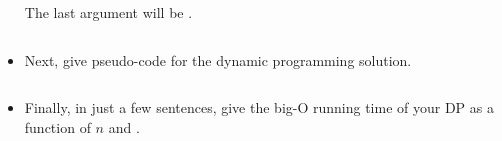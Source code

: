 \documentclass{ks-pset}
\begin{document}
\begin{problem}
\begin{itemize}
      The last argument will be .

      \begin{aside}
        \inputminted{python}{template/recursive_change.py}
      \end{aside}

    \item Next, give pseudo-code for the dynamic programming solution.

      \begin{aside}
        \inputminted{python}{template/changeDP.py}
      \end{aside}

    \item Finally, in just a few sentences, give the big-O running time of your
      DP as a function of \(n\) and .

  \end{itemize}

\end{problem}

\begin{solution}

\end{solution}
\end{document}
